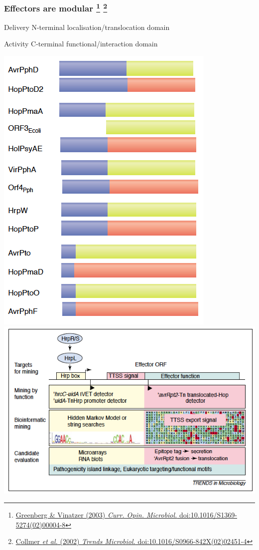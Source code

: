 \begin{frame}
  \frametitle{Effectors are modular
  \footnote{\tiny{\href{http://dx.doi.org/10.1016/S1369-5274(02)00004-8}{Greenberg \& Vinatzer (2003) \textit{Curr. Opin. Microbiol.} doi:10.1016/S1369-5274(02)00004-8}}}
  \footnote{\tiny{\href{http://dx.doi.org/10.1016/S0966-842X(02)02451-4}{Collmer \textit{et al.} (2002) \textit{Trends Microbiol.} doi:10.1016/S0966-842X(02)02451-4}}}
  }
  \begin{footnotesize}
    \begin{alertblock}{Delivery}
      N-terminal localisation/translocation domain
    \end{alertblock}
    \begin{block}{Activity}
      C-terminal functional/interaction domain
    \end{block}  
  \end{footnotesize}
  \begin{center}
    \includegraphics[height=0.425\textheight]{images/modular_t3ss_greenberg_2003}    
    \includegraphics[height=0.425\textheight]{images/modular_ttss_collmer_2002}        

\end{center}
\end{frame}
